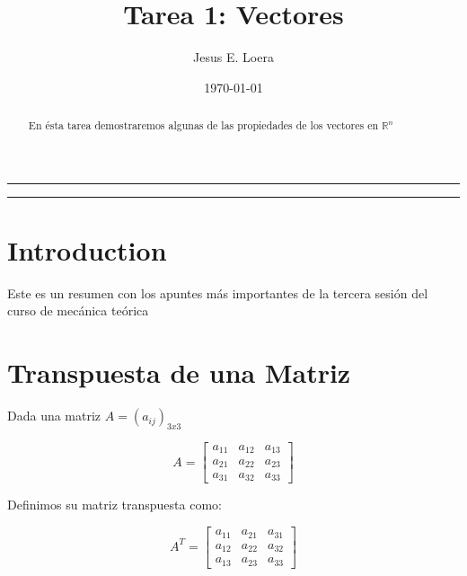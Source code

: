 \documentclass{article}
\title{Tarea 1: Vectores}
\author{Jesus E. Loera}
\date{\today}
\begin{document}


\maketitle      			%

\tableofcontents			%

\begin{center}
	\rule[0mm]{150mm}{0.1mm}		%
	\end{center}
	
	
\begin{abstract}			%

	\noindent 				%
	En ésta tarea demostraremos algunas de las propiedades de los vectores en 
	$\mathbb{R}^{n}$
	\end{abstract}
	
\begin{center}
	\rule[0mm]{150mm}{0.1mm}
	\end{center}

\section*{Introduction}		%
                            
    Este es un resumen con los apuntes más importantes de la tercera sesión del curso de mecánica teórica

\section{Transpuesta de una Matriz}


    Dada una matriz $ A = (a_{ij})_{3x3} $

    \begin{equation}
        A= \begin{bmatrix}
                a_{11} & a_{12} & a_{13} \\
                a_{21} & a_{22} & a_{23} \\
                a_{31} & a_{32} & a_{33} 
           \end{bmatrix}
    \end{equation}

    Definimos su matriz transpuesta como:

    \begin{equation}
      A^{T}= \begin{bmatrix}
              a_{11} & a_{21} & a_{31} \\
              a_{12} & a_{22} & a_{32} \\
              a_{13} & a_{23} & a_{33} 
      \end{bmatrix}
    \end{equation}
\end{document}
